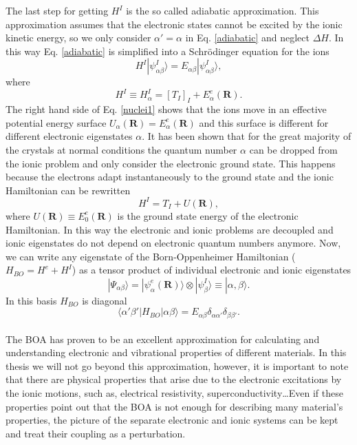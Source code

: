 The last step for getting $H^{I}$ is the so called adiabatic approximation. This approximation assumes that the electronic states cannot be excited by the ionic kinetic energy, so we only consider $\alpha'=\alpha$ in 
Eq. \ref{adiabatic} and neglect $\Delta H$. In this way Eq. \ref{adiabatic} is simplified into a Schr\"{o}dinger equation for the ions
\begin{equation}
 \label{schrodinger-nuclei}
 H^{I}|\psi_{\alpha\beta}^{I}\rangle=E_{\alpha\beta}|\psi_{\alpha\beta}^{I}\rangle,
\end{equation}
where
\begin{equation}
 \label{nuclei1}
 H^{I}\equiv H_{\alpha}^{I}=[T_{I}]_{I}+E_{\alpha}^{e}(\mathbf{R}).
\end{equation}
The right hand side of Eq. \ref{nuclei1} shows that the ions move in an effective potential energy surface $U_{\alpha}(\mathbf{R})=E_{\alpha}^{e}(\mathbf{R})$ and this surface is different for different electronic 
eigenstates $\alpha$. It has been shown that for the great majority of the crystals at normal conditions the quantum number $\alpha$ can be dropped from the ionic problem and only consider the electronic ground state. This 
happens because the electrons adapt instantaneously to the ground state and the ionic Hamiltonian can be rewritten
\begin{equation}
\label{nuclei}
H^{I}=T_{I}+U(\mathbf{R}),
\end{equation}
where $U(\mathbf{R})\equiv E_{0}^{e}(\mathbf{R})$ is the ground state energy of the electronic Hamiltonian. In this way the electronic and ionic problems are decoupled and ionic eigenstates do not depend on electronic quantum 
numbers anymore. Now, we can write any eigenstate of the Born-Oppenheimer Hamiltonian ($H_{BO}=H^{e}+H^{I}$) as a tensor product of individual electronic and ionic eigenstates
\begin{equation}
 |\Psi_{\alpha\beta}\rangle=|\psi_{\alpha}^{e}(\mathbf{R})\rangle\otimes|\psi_{\beta}^{I}\rangle\equiv|\alpha,\beta\rangle.
\end{equation}
In this basis $H_{BO}$ is diagonal
\begin{equation}
 \langle\alpha'\beta'|H_{BO}|\alpha\beta\rangle=E_{\alpha\beta}\delta_{\alpha\alpha'}\delta_{\beta\beta'}.
\end{equation}
\\

The BOA has proven to be an excellent approximation for calculating and understanding electronic and vibrational properties of different materials. In this thesis we will not go beyond this approximation, however, it is important to 
note that there are physical properties that arise due to the electronic excitations by the ionic motions, such as, electrical resistivity, superconductivity\dots Even if these properties point out that the BOA is not enough for 
describing many material's properties, the picture of the separate electronic and ionic systems can be kept and treat their coupling as a perturbation.
